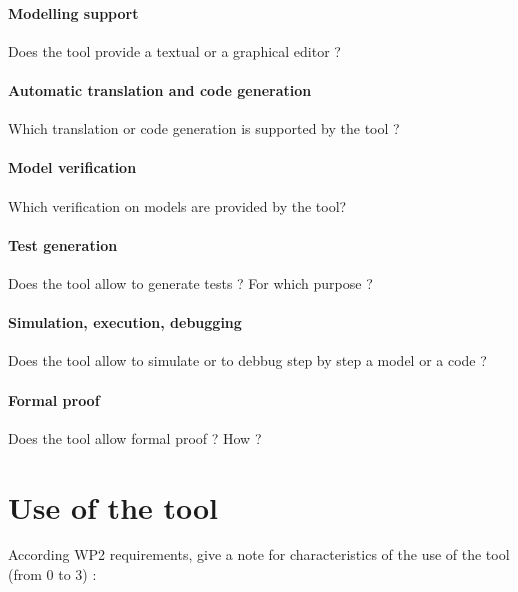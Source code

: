 \paragraph{Modelling support}
Does the tool provide a  textual or a graphical editor ?

\paragraph{Automatic translation and code generation}
Which translation or code generation is supported by the tool ?

\paragraph{Model verification}
Which verification on models are provided by the tool?

\paragraph{Test generation}
Does the tool allow to generate tests ? For  which purpose ?

\paragraph{Simulation, execution, debugging}
Does the tool allow to simulate or to debbug step by step a model or a code ?

\paragraph{Formal proof}
Does the tool allow formal proof ?  How ?



\section{Use of the tool}


According WP2 requirements, give a note for characteristics of the use of the tool (from 0 to 3) :

